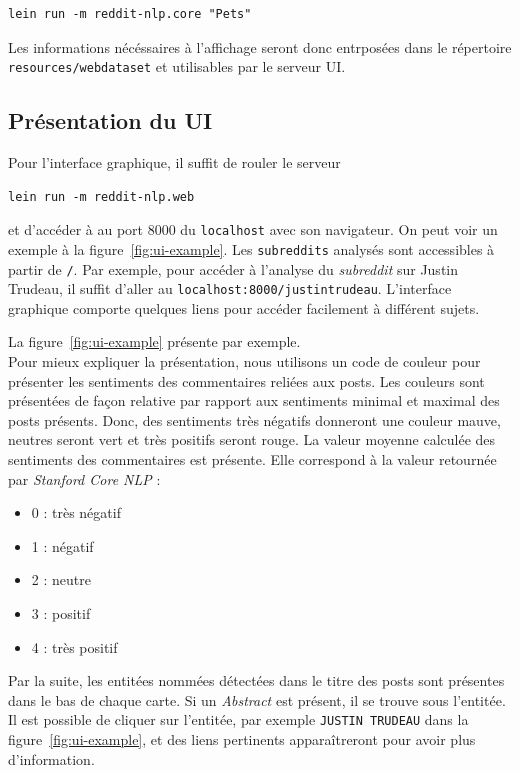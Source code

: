 \documentclass[12pt]{article}
\begin{document}
\begin{verbatim}
lein run -m reddit-nlp.core "Pets"
\end{verbatim}

Les informations nécéssaires à l'affichage seront donc entrposées dans le répertoire \verb;resources/webdataset; et utilisables par le serveur UI.

\subsection{Présentation du UI}

Pour l'interface graphique, il suffit de rouler le serveur

\begin{verbatim}
lein run -m reddit-nlp.web
\end{verbatim}

et d'accéder à au port 8000 du \verb;localhost; avec son navigateur. On peut voir un exemple à la figure~\ref{fig:ui-example}. Les \verb;subreddits; analysés sont accessibles à partir de \verb;/;. Par exemple, pour accéder à l'analyse du \emph{subreddit} sur Justin Trudeau, il suffit d'aller au \verb;localhost:8000/justintrudeau;.
L'interface graphique comporte quelques liens pour accéder facilement à différent sujets.

La figure~\ref{fig:ui-example} présente par exemple. \\

Pour mieux expliquer la présentation, nous utilisons un code de couleur pour présenter les sentiments des commentaires reliées aux posts. Les couleurs sont présentées de façon relative par rapport aux sentiments minimal et maximal des posts présents. Donc, des sentiments très négatifs donneront une couleur mauve, neutres seront vert et très positifs seront rouge. La valeur moyenne calculée des sentiments des commentaires est présente. Elle correspond à la valeur retournée par \textit{Stanford Core NLP} :

\begin{itemize}
\item 0 : très négatif
\item 1 : négatif
\item 2 : neutre
\item 3 : positif
\item 4 : très positif
\\
\end{itemize}

Par la suite, les entitées nommées détectées dans le titre des posts sont présentes dans le bas de chaque carte. Si un \textit{Abstract} est présent, il se trouve sous l'entitée. Il est possible de cliquer sur l'entitée, par exemple \verb;JUSTIN TRUDEAU; dans la figure~\ref{fig:ui-example}, et des liens pertinents apparaîtreront pour avoir plus d'information.
\end{document}
